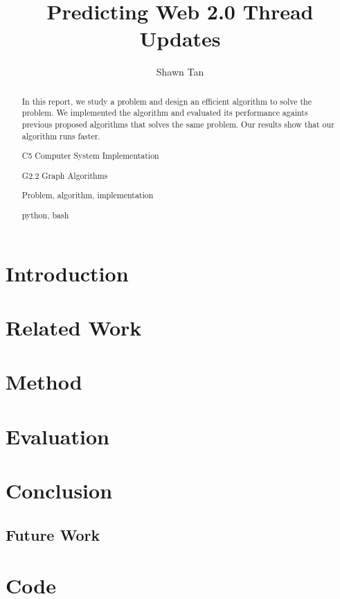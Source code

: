 \documentclass[hyp]{socreport}
\begin{document}
\title{Predicting Web 2.0 Thread Updates}
\author{Shawn Tan}
\maketitle
\begin{abstract}
In this report, we study a problem and design an efficient algorithm
to solve the problem.  We implemented the algorithm and evaluated
its performance againts previous proposed algorithms that solves the
same problem.  Our results show that our algorithm runs faster.

\begin{descriptors}
    \item C5 Computer System Implementation
	\item G2.2 Graph Algorithms
\end{descriptors}
\begin{keywords}
	Problem, algorithm, implementation
\end{keywords}
\begin{implement}
	python, bash
\end{implement}
\end{abstract}

\begin{acknowledgement}
\end{acknowledgement}

\listoffigures 
\listoftables
\tableofcontents 

\chapter{Introduction}
	
\chapter{Related Work}
	
\chapter{Method}
	
\chapter{Evaluation}
	
\chapter{Conclusion}
\section{Future Work}




\appendix
\chapter{Code}
\end{document}
